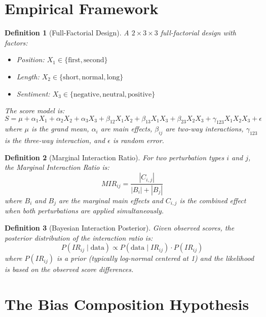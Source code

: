 \documentclass[11pt]{article}
\newtheorem{definition}{Definition}
\begin{document}
\section{Empirical Framework}

\begin{definition}[Full-Factorial Design]
A $2 \times 3 \times 3$ full-factorial design with factors:
\begin{itemize}
    \item Position: $X_1 \in \{\text{first}, \text{second}\}$
    \item Length: $X_2 \in \{\text{short}, \text{normal}, \text{long}\}$
    \item Sentiment: $X_3 \in \{\text{negative}, \text{neutral}, \text{positive}\}$
\end{itemize}
The score model is:
\begin{equation}
S = \mu + \alpha_1 X_1 + \alpha_2 X_2 + \alpha_3 X_3 + \beta_{12} X_1 X_2 + \beta_{13} X_1 X_3 + \beta_{23} X_2 X_3 + \gamma_{123} X_1 X_2 X_3 + \epsilon
\end{equation}
where $\mu$ is the grand mean, $\alpha_i$ are main effects, $\beta_{ij}$ are two-way interactions, $\gamma_{123}$ is the three-way interaction, and $\epsilon$ is random error.
\end{definition}

\begin{definition}[Marginal Interaction Ratio]
For two perturbation types $i$ and $j$, the Marginal Interaction Ratio is:
\begin{equation}
MIR_{ij} = \frac{|C_{i,j}|}{|B_i| + |B_j|}
\end{equation}
where $B_i$ and $B_j$ are the marginal main effects and $C_{i,j}$ is the combined effect when both perturbations are applied simultaneously.
\end{definition}

\begin{definition}[Bayesian Interaction Posterior]
Given observed scores, the posterior distribution of the interaction ratio is:
\begin{equation}
P(IR_{ij} \mid \text{data}) \propto P(\text{data} \mid IR_{ij}) \cdot P(IR_{ij})
\end{equation}
where $P(IR_{ij})$ is a prior (typically log-normal centered at 1) and the likelihood is based on the observed score differences.
\end{definition}

\section{The Bias Composition Hypothesis}
\end{document}
